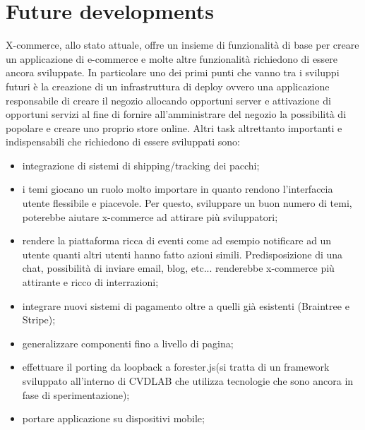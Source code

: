 \section{Future developments}
\label{sec:future_work}
{\color{red}
X-commerce, allo stato attuale, offre un insieme di funzionalità di base per creare un applicazione di e-commerce e molte altre funzionalità richiedono di essere ancora sviluppate.
In particolare uno dei primi punti che vanno tra i sviluppi futuri è la creazione di un infrastruttura di deploy ovvero una applicazione responsabile di creare il negozio allocando opportuni server e attivazione di opportuni servizi al fine di fornire all'amministrare del negozio la possibilità di popolare e creare uno proprio store online.
\newline
Altri task altrettanto importanti e indispensabili che richiedono di essere sviluppati sono:
\begin{itemize}
\item integrazione di sistemi di shipping/tracking dei pacchi;
\item i temi giocano un ruolo molto importare in quanto rendono l'interfaccia utente flessibile e piacevole. Per questo, sviluppare un buon numero di temi, poterebbe aiutare x-commerce ad attirare più sviluppatori;
\item rendere la piattaforma ricca di eventi come ad esempio notificare ad un utente quanti altri utenti hanno fatto azioni simili. Predisposizione di una chat, possibilità di inviare email, blog, etc... renderebbe x-commerce più attirante e ricco di interrazioni;
\item integrare nuovi sistemi di pagamento oltre a quelli già esistenti (Braintree e Stripe);
\item generalizzare componenti fino a livello di pagina;
\item effettuare il porting da loopback a forester.js(si tratta di un framework sviluppato all'interno di CVDLAB che utilizza tecnologie che sono ancora in fase di sperimentazione);
\item portare applicazione su dispositivi mobile;
\end{itemize}
}